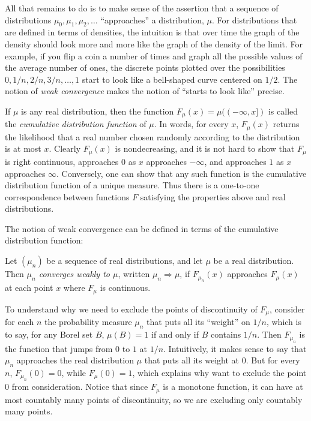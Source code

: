 \documentclass{svjour3}
\begin{document}
All that remains to do is to make sense of the assertion that a sequence of distributions $\mu_0, \mu_1, \mu_2, \ldots$ ``approaches'' a distribution, $\mu$. For distributions that are defined in terms of densities, the intuition is that over time the graph of the density should look more and more like the graph of the density of the limit. For example, if you flip a coin a number of times and graph all the possible values of the average number of ones, the discrete points plotted over the possibilities $0, 1/n, 2/n, 3/n, \ldots, 1$ start to look like a bell-shaped curve centered on $1 / 2$. The notion of \emph{weak convergence} makes the notion of ``starts to look like'' precise.

If $\mu$ is any real distribution, then the function $F_\mu(x) = \mu((-\infty, x])$ is called the \emph{cumulative distribution function} of $\mu$. In words, for every $x$, $F_\mu(x)$ returns the likelihood that a real number chosen randomly according to the distribution is at most $x$. Clearly $F_\mu(x)$ is nondecreasing, and it is not hard to show that $F_\mu$ is right continuous, approaches $0$ as $x$ approaches $-\infty$, and approaches $1$ as $x$ approaches $\infty$. Conversely, one can show that any such function is the cumulative distribution function of a unique measure. Thus there is a one-to-one correspondence between functions $F$ satisfying the properties above and real distributions.

The notion of weak convergence can be defined in terms of the cumulative distribution function:
\begin{definition}
 Let $(\mu_n)$ be a sequence of real distributions, and let $\mu$ be a real distribution. Then \emph{$\mu_n$ converges weakly to $\mu$}, written $\mu_n \Rightarrow \mu$, if $F_{\mu_n}(x)$ approaches $F_\mu(x)$ at each point $x$ where $F_\mu$ is continuous.
\end{definition}

To understand why we need to exclude the points of discontinuity of $F_\mu$, consider for each $n$ the probability measure $\mu_n$ that puts all its ``weight'' on $1 / n$, which is to say, for any Borel set $B$, $\mu(B) = 1$ if and only if $B$ contains $1 / n$. Then $F_{\mu_n}$ is the function that jumps from $0$ to $1$ at $1 / n$. Intuitively, it makes sense to say that $\mu_n$ approaches the real distribution $\mu$ that puts all its weight at $0$. But for every $n$, $F_{\mu_n}(0) = 0$, while $F_\mu(0) = 1$, which explains why want to exclude the point $0$ from consideration. Notice that since $F_\mu$ is a monotone function, it can have at most countably many points of discontinuity, so we are excluding only countably many points.
\end{document}
